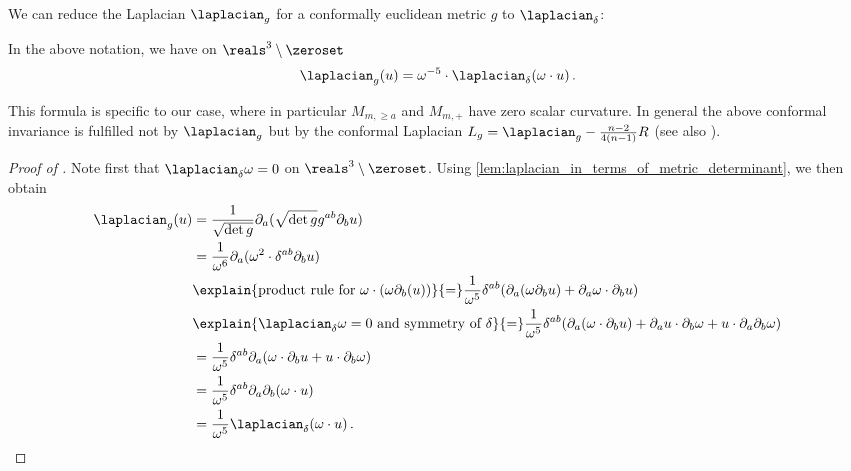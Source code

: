\documentclass[titlepage,numbers=noenddot,oneside,%
cleardoublepage=empty,paper=a4,fontsize=11pt,%
english,%
]{scrartcl}
\newcommand*{\mathfullstop}{\,.}
\begin{document}
We can reduce the Laplacian \( \laplacian_g \) for a conformally euclidean metric \( g \) to \( \laplacian_{\delta} \):
\begin{lemma}\label{lem:laplacian_on_schwarzschild}
    In the above notation, we have on \( \reals^3\setminus \zeroset \)
    \begin{equation*}
        \laplacian_g(u)=\omega^{-5}\cdot \laplacian_\delta(\omega \cdot u)\mathfullstop
    \end{equation*}
\end{lemma}
\begin{remark}
    This formula is specific to our case, where in particular \( M_{m,\geq a} \) and \( M_{m,+} \) have zero scalar curvature. In general the above conformal invariance is fulfilled not by \( \laplacian_g \) but by the conformal Laplacian \( L_g=\laplacian_g-\frac{n-2}{4(n-1)}R \) (see also \cite[Definition 3]{curryIntroductionConformalGeometry2015}).
\end{remark}
\begin{proof}[Proof of ]
    Note first that \( \laplacian_\delta \omega=0 \) on \( \reals^3\setminus \zeroset \). Using \cref{lem:laplacian_in_terms_of_metric_determinant}, we then obtain
    \begin{equation*}
        \begin{aligned}[t]
            \laplacian_g(u)\begin{aligned}[t]
                &=\frac{1}{\sqrt{\det{g}}}\partial_a(\sqrt{\det{g}}g^{ab}\partial_b u)\\
                &=\frac{1}{\omega^6}\partial_a(\omega^{2}\cdot \delta^{ab} \partial_b u)\\
                &\explain{\text{product rule for \( \omega\cdot (\omega \partial_b(u)) \)}}{=}\frac{1}{\omega^5}\delta^{ab}(\partial_a(\omega \partial_b u)+\partial_a \omega\cdot \partial_b u)\\
                &\explain{\text{\( \laplacian_\delta \omega=0 \) and symmetry of \( \delta \)}}{=}\frac{1}{\omega^5}\delta^{ab}(\partial_a(\omega\cdot \partial_b u)+\partial_a u\cdot \partial_b \omega+u\cdot \partial_a \partial_b \omega)\\
                &=\frac{1}{\omega^5}\delta^{ab}\partial_a(\omega\cdot \partial_b u +u\cdot \partial_b \omega)\\
                &=\frac{1}{\omega^5}\delta^{ab}\partial_a  \partial_b(\omega\cdot u)\\
                &=\frac{1}{\omega^5}\laplacian_\delta(\omega\cdot u)\mathfullstop
            \end{aligned}
        \end{aligned}
    \end{equation*}
\end{proof}
\end{document}

